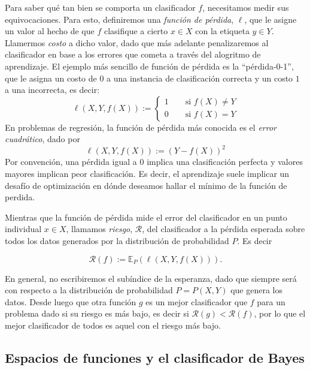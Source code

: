 \documentclass{report}
\begin{document}
Para saber qué tan bien se comporta un clasificador $f$, necesitamos medir sus equivocaciones. Para esto, definiremos una \textit{función de pérdida},
$\ell$, que le asigne un valor al hecho de que $f$ clasifique a cierto $x\in X$ con la etiqueta $y\in Y$. Llamermos \textit{costo} a dicho valor, 
dado que más adelante penalizaremos al clasificador en base a los errores que cometa a través del alogritmo de aprendizaje.\newline
El ejemplo más sencillo de función de pérdida es la ``pérdida-0-1'', que le asigna un costo de $0$ a una instancia de clasificación correcta y un costo
$1$ a una incorrecta, es decir:
\[
\ell(X,Y,f(X)):= \begin{cases}
    1 \qquad \text{si } f(X) \neq Y \\
    0 \qquad \text{si } f(X) = Y
\end{cases}
\]
En problemas de regresión, la función de pérdida más conocida es el \textit{error cuadrático}, dado por
\[
\ell(X,Y,f(X)):= (Y-f(X))^2
\]
Por convención, una pérdida igual a $0$ implica una clasificación perfecta y valores mayores implican peor clasificación. Es decir,
el aprendizaje suele implicar un desafío de optimización en dónde deseamos hallar el mínimo de la función de perdida.\newline

Mientras que la función de pérdida mide el error del clasificador en un punto individual $x\in X$, llamamos \textit{riesgo}, $\mathcal{R}$, 
del clasificador a la pérdida esperada sobre todos los datos generados por la distribución de probabilidad $P$. Es decir \newline

\[
\mathcal{R}(f) := \mathbb{E}_{P}\left( \ell(X,Y,f(X)) \right).
\]\newline

En general, no escribiremos el subíndice de la esperanza, dado que siempre será con respecto a la distribución de probabilidad $P=P(X,Y)$ que genera los datos.
Desde luego que otra función $g$ es un mejor clasificador que $f$ para un problema dado si su riesgo es más bajo, es decir si $\mathcal{R}(g)
< \mathcal{R}(f)$, por lo que el mejor clasificador de todos es aquel con el riesgo más bajo.\newline

\subsection{Espacios de funciones y el clasificador de Bayes}
\end{document}
